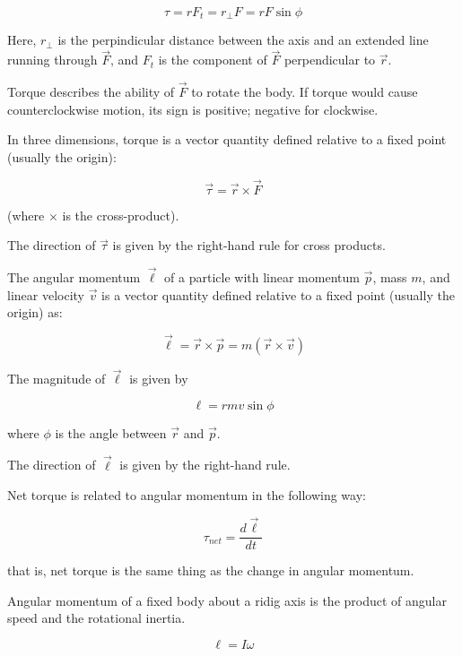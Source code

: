 \documentclass{article}
\begin{document}
\[ \tau = r F_t = r_\bot F =  r F \sin{\phi} \]

Here, $r_\bot$ is the perpindicular distance between the axis and an extended line running through $\vec{F}$, and $F_t$ is the \@{component} of $\vec{F}$ \@{perpendicular} to $\vec{r}$.

Torque describes the ability of $\vec{F}$ to rotate the body. If torque would cause counterclockwise motion, its sign is positive; negative for clockwise.

In three dimensions, torque is a vector quantity defined relative to a fixed point (usually the origin):

\[ \vec{\tau} = \vec{r} \times \vec{F} \]

(where $\times$ is the \@{cross-product}).

The direction of $\vec{\tau}$ is given by the right-hand rule for cross products.

The angular momentum $\vec{\ell}$ of a particle with linear momentum $\vec{p}$, mass $m$, and linear velocity $\vec{v}$ is a vector quantity defined relative to a fixed point (usually the origin) as:

\[ \vec{\ell} = \vec{r} \times \vec{p} = m (\vec{r} \times \vec{v}) \]

The \@{magnitude} of $\vec{\ell}$ is given by

\[ \ell = rmv \sin{\phi} \]

where $\phi$ is the angle between $\vec{r}$ and $\vec{p}$.

The direction of $\vec{\ell}$ is given by the right-hand rule.

Net torque is related to angular momentum in the following way:

\[ \tau_{net} = \frac{d\vec{\ell}}{dt} \]

that is, net torque is the same thing as the change in angular momentum.

Angular momentum of a fixed body about a ridig axis is the product of angular speed and the rotational inertia.

\[ \ell = I\omega \]
\end{document}

